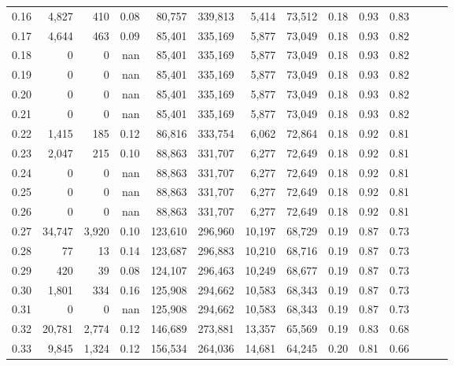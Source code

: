 \begin{tabular}{rrrrrrrrrrrrrr}
0.16 &   4,827 &    410 &  0.08 &   80,757 &  339,813 &   5,414 &  73,512 &  0.18 &  0.93 &      0.83 \\
0.17 &   4,644 &    463 &  0.09 &   85,401 &  335,169 &   5,877 &  73,049 &  0.18 &  0.93 &      0.82 \\
0.18 &       0 &      0 &   nan &   85,401 &  335,169 &   5,877 &  73,049 &  0.18 &  0.93 &      0.82 \\
0.19 &       0 &      0 &   nan &   85,401 &  335,169 &   5,877 &  73,049 &  0.18 &  0.93 &      0.82 \\
0.20 &       0 &      0 &   nan &   85,401 &  335,169 &   5,877 &  73,049 &  0.18 &  0.93 &      0.82 \\
0.21 &       0 &      0 &   nan &   85,401 &  335,169 &   5,877 &  73,049 &  0.18 &  0.93 &      0.82 \\
0.22 &   1,415 &    185 &  0.12 &   86,816 &  333,754 &   6,062 &  72,864 &  0.18 &  0.92 &      0.81 \\
0.23 &   2,047 &    215 &  0.10 &   88,863 &  331,707 &   6,277 &  72,649 &  0.18 &  0.92 &      0.81 \\
0.24 &       0 &      0 &   nan &   88,863 &  331,707 &   6,277 &  72,649 &  0.18 &  0.92 &      0.81 \\
0.25 &       0 &      0 &   nan &   88,863 &  331,707 &   6,277 &  72,649 &  0.18 &  0.92 &      0.81 \\
0.26 &       0 &      0 &   nan &   88,863 &  331,707 &   6,277 &  72,649 &  0.18 &  0.92 &      0.81 \\
0.27 &  34,747 &  3,920 &  0.10 &  123,610 &  296,960 &  10,197 &  68,729 &  0.19 &  0.87 &      0.73 \\
0.28 &      77 &     13 &  0.14 &  123,687 &  296,883 &  10,210 &  68,716 &  0.19 &  0.87 &      0.73 \\
0.29 &     420 &     39 &  0.08 &  124,107 &  296,463 &  10,249 &  68,677 &  0.19 &  0.87 &      0.73 \\
0.30 &   1,801 &    334 &  0.16 &  125,908 &  294,662 &  10,583 &  68,343 &  0.19 &  0.87 &      0.73 \\
0.31 &       0 &      0 &   nan &  125,908 &  294,662 &  10,583 &  68,343 &  0.19 &  0.87 &      0.73 \\
0.32 &  20,781 &  2,774 &  0.12 &  146,689 &  273,881 &  13,357 &  65,569 &  0.19 &  0.83 &      0.68 \\
0.33 &   9,845 &  1,324 &  0.12 &  156,534 &  264,036 &  14,681 &  64,245 &  0.20 &  0.81 &      0.66 \\

\end{tabular}
